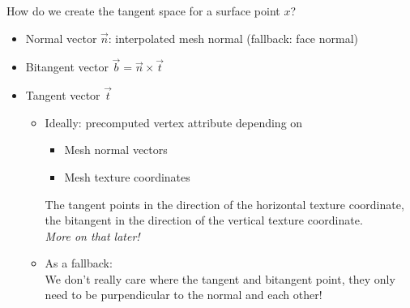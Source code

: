 \documentclass[utf8,stillsansserifmath,fleqn,t]{beamer}
\begin{document}
\begin{frame}
\frametitle{\insertsection}
How do we create the tangent space for a surface point $x$?
\begin{itemize}
\item Normal vector $\vec{n}$: interpolated mesh normal (fallback: face normal)
\item Bitangent vector $\vec{b} = \vec{n}\times \vec{t}$
\item Tangent vector $\vec{t}$
    \begin{itemize}
    \item Ideally: precomputed vertex attribute depending on
        \begin{itemize}
        \item Mesh normal vectors
        \item Mesh texture coordinates
        \end{itemize}
        The tangent points in the direction of the horizontal texture coordinate,
        the bitangent in the direction of the vertical texture coordinate.\\
        \emph{More on that later!}
    \item As a fallback:\\
        We don't really care where the tangent and bitangent point, they only
        need to be purpendicular to the normal and each other!
    \end{itemize}
\end{itemize}
\end{frame}
\end{document}
